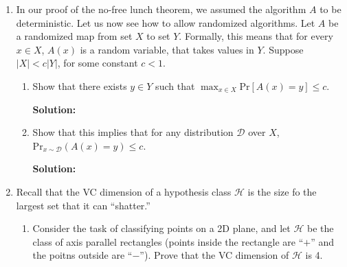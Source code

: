 \documentclass[12pt]{article}
\newcommand{\abs}[1]{\left| #1 \right|}
\renewcommand{\Pr}[1]{\text{Pr}[ #1 ]}
\begin{document}
\begin{enumerate}
\begin{enumerate}
{\bf Solution:}

Probability of not choosing an integer at random on the infinite domain.

\item Suppose $n \geq 3$, and $\Pr{A_{i}} = \frac{1}{n-1}$, but the events are all {\em independent}. Show that the probability that none of them occur is $\geq 1/8$.

{\bf Solution:}

\begin{align*}
\intertext{Probability of not choosing one}
P(A_{i}) &= \left( 1 - \frac{1}{n-1}\right)\\
\intertext{probability of not choosing $n$ independent}
P(A_{1}, A_{2}, \ldots, A_{n}) &= \left( 1 - \frac{1}{n-1}\right)^{n} = \left( - \frac{2-n}{n-1}\right)^{n}\\
\intertext{We can bound it by using $n = 3$, which gives}
P(A_{1}, A_{2}, A_{3}) &= \frac{1}{8}
\end{align*}
\end{enumerate}

\item In our proof of the no-free lunch theorem, we assumed the algorithm $A$ to be deterministic. Let us now see how to allow randomized algorithms. Let $A$ be a randomized map from set $X$ to set $Y$. Formally, this means that for every $x \in X$, $A(x)$ is a random variable, that takes values in $Y$. Suppose $\abs{X} < c\abs{Y}$, for some constant $c < 1$. 

\begin{enumerate}
\item Show that there exists $y \in Y$ such that $\max_{x\in X}\Pr{A(x) = y} \leq c$.

{\bf Solution:}

\item Show that this implies that for any distribution $\mathcal{D}$ over $X$, $\text{Pr}_{x\sim \mathcal{D}}(A(x) = y) \leq c$.

{\bf Solution:}

\end{enumerate}

\item Recall that the VC dimension of a hypothesis class $\mathcal{H}$ is the size fo the largest set that it can ``shatter.''

\begin{enumerate}
\item Consider the task of classifying points on a 2D plane, and let $\mathcal{H}$ be the class of axis parallel rectangles (points inside the rectangle are ``$+$'' and the poitns outside are ``$-$''). Prove that the VC dimension of $\mathcal{H}$ is 4.


\end{enumerate}
\end{enumerate}
\end{document}
